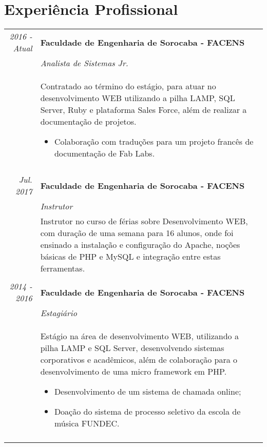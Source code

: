 \documentclass[a4paper,10pt]{article}
\begin{document}
\section{Experiência Profissional}
\begin{tabular}{r|p{11cm}}
 \emph{2016 - Atual} & \textbf{Faculdade de Engenharia de Sorocaba - FACENS} \\
 & \emph{\textit{Analista de Sistemas Jr.}} \\
 & \footnotesize{Contratado ao término do estágio, para atuar no desenvolvimento WEB utilizando a pilha LAMP, SQL Server, Ruby e plataforma Sales Force, além de realizar a documentação de projetos. 
 \begin{itemize}
 	\item Colaboração com traduções para um projeto francês de documentação de Fab Labs.
 \end{itemize} } \\ \multicolumn{2}{c}{} \\
 
\emph{Jul. 2017} & \textbf{Faculdade de Engenharia de Sorocaba - FACENS} \\
 & \emph{\textit{Instrutor}} \\
 & \footnotesize{Instrutor no curso de férias sobre Desenvolvimento WEB, com duração de uma semana para 16 alunos, onde foi ensinado a instalação e configuração do Apache, noções básicas de PHP e MySQL e integração entre estas ferramentas.} \\ \multicolumn{2}{c}{} \\
  
 \emph{2014 - 2016} & \textbf{Faculdade de Engenharia de Sorocaba - FACENS} \\
 & \emph{\textit{Estagiário}} \\
 & \footnotesize{Estágio na área de desenvolvimento WEB, utilizando a pilha LAMP e SQL Server, desenvolvendo sistemas corporativos e acadêmicos, além de colaboração para o desenvolvimento de uma micro framework em PHP.
  \begin{itemize}
 	\item Desenvolvimento de um sistema de chamada online;
 	\item Doação do sistema de processo seletivo da escola de música FUNDEC.
 \end{itemize}} \\ \multicolumn{2}{c}{} \\
\end{tabular}
\end{document}
